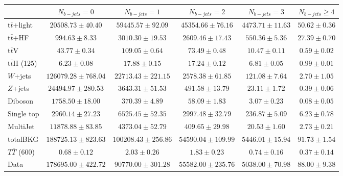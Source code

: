 \begin{tabular}{l c c c c c } \toprule
 & $N_{b-jets}= 0$ & $N_{b-jets}= 1$ & $N_{b-jets}= 2$ & $N_{b-jets}= 3$ & $N_{b-jets}\geq 4$ \\ \midrule 
 t$\bar{t}$+light & $20508.73 \pm 40.40$  & $59445.57 \pm 92.09$  & $45354.66 \pm 76.16$  & $4473.71 \pm 11.63$  & $50.62 \pm 0.36$  \\ 
 t$\bar{t}$+HF & $994.63 \pm 8.33$  & $3010.30 \pm 19.53$  & $2609.46 \pm 17.43$  & $550.36 \pm 5.36$  & $27.39 \pm 0.70$  \\ \midrule 
 t$\bar{t}$V & $43.77 \pm 0.34$  & $109.05 \pm 0.64$  & $73.49 \pm 0.48$  & $10.47 \pm 0.11$  & $0.59 \pm 0.02$  \\ 
 t$\bar{t}$H (125) & $6.23 \pm 0.08$  & $17.88 \pm 0.15$  & $17.24 \pm 0.12$  & $6.81 \pm 0.05$  & $0.99 \pm 0.01$  \\ 
 $W$+jets & $126079.28 \pm 768.04$  & $22713.43 \pm 221.15$  & $2578.38 \pm 61.85$  & $121.08 \pm 7.64$  & $2.70 \pm 1.05$  \\ 
 $Z$+jets & $24494.97 \pm 280.53$  & $3643.31 \pm 51.53$  & $491.58 \pm 13.79$  & $23.11 \pm 1.72$  & $0.39 \pm 0.06$  \\ 
 Diboson & $1758.50 \pm 18.00$  & $370.39 \pm 4.89$  & $58.09 \pm 1.83$  & $3.07 \pm 0.23$  & $0.08 \pm 0.05$  \\ 
 Single top & $2960.14 \pm 27.23$  & $6525.45 \pm 52.35$  & $2997.48 \pm 32.79$  & $236.87 \pm 5.09$  & $6.23 \pm 0.78$  \\ 
 MultiJet & $11878.88 \pm 83.85$  & $4373.04 \pm 52.79$  & $409.65 \pm 29.98$  & $20.53 \pm 1.60$  & $2.73 \pm 0.21$  \\ \midrule 
 totalBKG & $188725.13 \pm 823.63$  & $100208.43 \pm 256.86$  & $54590.04 \pm 109.99$  & $5446.01 \pm 15.94$  & $91.73 \pm 1.54$  \\ \midrule 
 $T\bar{T}$ (600) & $0.68 \pm 0.12$  & $2.03 \pm 0.26$  & $1.83 \pm 0.23$  & $0.74 \pm 0.16$  & $0.37 \pm 0.14$  \\ \midrule 
 Data & $178695.00 \pm 422.72$  & $90770.00 \pm 301.28$  & $55582.00 \pm 235.76$  & $5038.00 \pm 70.98$  & $88.00 \pm 9.38$  \\ 
 \bottomrule\end{tabular}